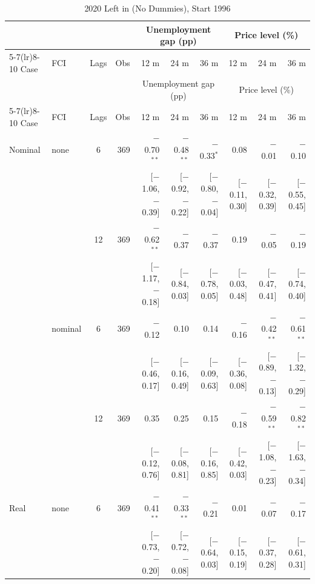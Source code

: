 \begingroup\scriptsize\setlength{\tabcolsep}{0.9pt}
\begin{longtable}{llcrrrrrrr}
\caption{2020 Left in (No Dummies), Start 1996}\label{tab:appR1}\\
\toprule
 & & & & \multicolumn{3}{c}{Unemployment gap (pp)} & \multicolumn{3}{c}{Price level (\%)}\\ \cmidrule(lr){5-7}\cmidrule(lr){8-10}
Case & FCI & Lags & Obs & 12 m & 24 m & 36 m & 12 m & 24 m & 36 m\\
\midrule\endfirsthead
\toprule
 & & & & \multicolumn{3}{c}{Unemployment gap (pp)} & \multicolumn{3}{c}{Price level (\%)}\\ \cmidrule(lr){5-7}\cmidrule(lr){8-10}
Case & FCI & Lags & Obs & 12 m & 24 m & 36 m & 12 m & 24 m & 36 m\\
\midrule\endhead
\bottomrule\endfoot
Nominal & none & 6 & 369 & $-$0.70$^{**}$ & $-$0.48$^{**}$ & $-$0.33$^{*}$ & 0.08 & $-$0.01 & $-$0.10\\
 & & & & {\scriptsize [$-$1.06, $-$0.39]} & {\scriptsize [$-$0.92, $-$0.22]} & {\scriptsize [$-$0.80, $-$0.04]} & {\scriptsize [$-$0.11, 0.30]} & {\scriptsize [$-$0.32, 0.39]} & {\scriptsize [$-$0.55, 0.45]}\\
 &  & 12 & 369 & $-$0.62$^{**}$ & $-$0.37 & $-$0.37 & 0.19 & $-$0.05 & $-$0.19\\
 & & & & {\scriptsize [$-$1.17, $-$0.18]} & {\scriptsize [$-$0.84, 0.03]} & {\scriptsize [$-$0.78, 0.05]} & {\scriptsize [$-$0.03, 0.48]} & {\scriptsize [$-$0.47, 0.41]} & {\scriptsize [$-$0.74, 0.40]}\\
 & nominal & 6 & 369 & $-$0.12 & 0.10 & 0.14 & $-$0.16 & $-$0.42$^{**}$ & $-$0.61$^{**}$\\
 & & & & {\scriptsize [$-$0.46, 0.17]} & {\scriptsize [$-$0.16, 0.49]} & {\scriptsize [$-$0.09, 0.63]} & {\scriptsize [$-$0.36, 0.08]} & {\scriptsize [$-$0.89, $-$0.13]} & {\scriptsize [$-$1.32, $-$0.29]}\\
 &  & 12 & 369 & 0.35 & 0.25 & 0.15 & $-$0.18 & $-$0.59$^{**}$ & $-$0.82$^{**}$\\
 & & & & {\scriptsize [$-$0.12, 0.76]} & {\scriptsize [$-$0.08, 0.81]} & {\scriptsize [$-$0.16, 0.85]} & {\scriptsize [$-$0.42, 0.03]} & {\scriptsize [$-$1.08, $-$0.23]} & {\scriptsize [$-$1.63, $-$0.34]}\\
\addlinespace
Real & none & 6 & 369 & $-$0.41$^{**}$ & $-$0.33$^{**}$ & $-$0.21 & 0.01 & $-$0.07 & $-$0.17\\
 & & & & {\scriptsize [$-$0.73, $-$0.20]} & {\scriptsize [$-$0.72, $-$0.08]} & {\scriptsize [$-$0.64, 0.03]} & {\scriptsize [$-$0.15, 0.19]} & {\scriptsize [$-$0.37, 0.28]} & {\scriptsize [$-$0.61, 0.31]}\\

\end{longtable}
